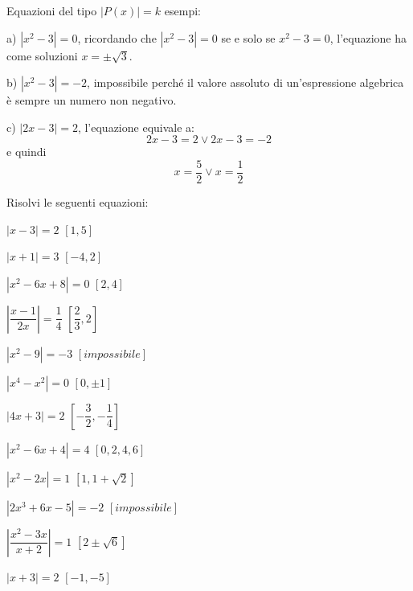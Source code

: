 \begin{esercizio}\label{ese:03.1}
Equazioni del tipo \(|P(x)|=k\) esempi:
\begin{enumeratea}
\item[a)] \(|x^2-3|=0\), ricordando che \(|x^2-3|=0\) se e solo se \(x^2-3=0\), 
l'equazione ha come soluzioni \(x=\pm\sqrt{3}\).
\item[b)] \(|x^2-3|=-2\), impossibile perché il valore assoluto di 
un'espressione 
algebrica è sempre un numero non negativo.
\item[c)] \(|2x-3|=2\), l'equazione equivale a:
\[2x-3=2 \vee 2x-3=-2\]
e quindi
\[x=\dfrac{5}{2}\vee x=\dfrac{1}{2}\]
\end{enumeratea}

\noindent Risolvi le seguenti equazioni:

\begin{multicols}{2}
\begin{enumeratea}
\item \(|x-3|=2\) \hfill \(\left[ 1, 5\right] \)
\item \(|x+1|=3\) \hfill \(\left[ -4, 2\right] \)
\item \(|x^2-6x+8|=0\) \hfill \(\left[ 2, 4\right] \)
\item \(\left| \dfrac{x-1}{2x}\right| =\dfrac{1}{4}\) \hfill \(\left[ 
\dfrac{2}{3}, 2\right] \)
\item \(|x^2-9|=-3\) \hfill \(\left[impossibile \right] \)
\item \(|x^4-x^2|=0\) \hfill \(\left[ 0, \pm 1\right] \)
\item \(|4x+3|=2\) \hfill \(\left[ -\dfrac{3}{2}, -\dfrac{1}{4} \right] \)
\item \(|x^2-6x+4|=4\) \hfill \(\left[ 0, 2, 4 , 6 \right] \)
\item \(|x^2-2x|=1\) \hfill \(\left[ 1, 1+\sqrt{2} \right] \)
\item \(|2x^3+6x-5|=-2\) \hfill \(\left[ impossibile \right] \)
\item \(\left| \dfrac{x^2-3x}{x+2}\right| =1\) \hfill \(\left[ 2\pm 
\sqrt{6} \right] \)
\item \(|x+3|=2\) \hfill \(\left[ -1, -5 \right] \)
\end{enumeratea}
\end{multicols}
\end{esercizio}

